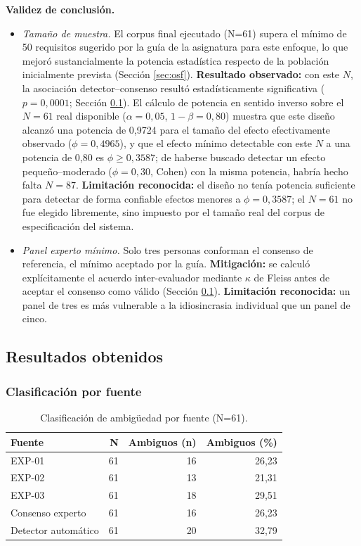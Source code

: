 \documentclass[journal,onecolumn]{IEEEtran}
\begin{document}
\textbf{Validez de conclusión.}
\begin{itemize}[leftmargin=*]
	\item \emph{Tamaño de muestra.} El corpus final ejecutado (N=61)
	supera el mínimo de 50 requisitos sugerido por la guía de la
	asignatura para este enfoque, lo que mejoró sustancialmente la
	potencia estadística respecto de la población inicialmente prevista
	(Sección \ref{sec:osf}). \textbf{Resultado observado:} con este $N$,
	la asociación detector--consenso resultó estadísticamente
	significativa ($p=0{,}0001$; Sección \ref{sec:resultados}). El
	cálculo de potencia en sentido inverso sobre el $N=61$ real
	disponible ($\alpha=0{,}05$, $1-\beta=0{,}80$) muestra que este
	diseño alcanzó una potencia de 0,9724 para el tamaño del efecto
	efectivamente observado ($\phi=0{,}4965$), y que el efecto mínimo
	detectable con este $N$ a una potencia de 0,80 es $\phi \geq 0{,}3587$;
	de haberse buscado detectar un efecto pequeño--moderado ($\phi=0{,}30$,
	Cohen) con la misma potencia, habría hecho falta $N=87$.
	\textbf{Limitación reconocida:} el diseño no tenía potencia
	suficiente para detectar de forma confiable efectos menores a
	$\phi=0{,}3587$; el $N=61$ no fue elegido libremente, sino impuesto
	por el tamaño real del corpus de especificación del sistema.
	\item \emph{Panel experto mínimo.} Solo tres personas conforman el
	consenso de referencia, el mínimo aceptado por la guía. \textbf{Mitigación:}
	se calculó explícitamente el acuerdo inter-evaluador mediante $\kappa$
	de Fleiss antes de aceptar el consenso como válido (Sección
	\ref{sec:resultados}). \textbf{Limitación reconocida:} un panel de
	tres es más vulnerable a la idiosincrasia individual que un panel de
	cinco.
\end{itemize}

\subsection{Resultados obtenidos}
\label{sec:resultados}

\subsubsection{Clasificación por fuente}

\begin{table}[H]
	\centering
	\caption{Clasificación de ambigüedad por fuente (N=61).}
	\label{tab:clasificacion-fuente}
	\begin{tabular}{@{}lrrr@{}}
		\toprule
		\textbf{Fuente} & \textbf{N} & \textbf{Ambiguos (n)} & \textbf{Ambiguos (\%)} \\
		\midrule
		EXP-01 & 61 & 16 & 26,23 \\
		EXP-02 & 61 & 13 & 21,31 \\
		EXP-03 & 61 & 18 & 29,51 \\
		Consenso experto & 61 & 16 & 26,23 \\
		Detector automático & 61 & 20 & 32,79 \\
		\bottomrule
	\end{tabular}
\end{table}
\end{document}
